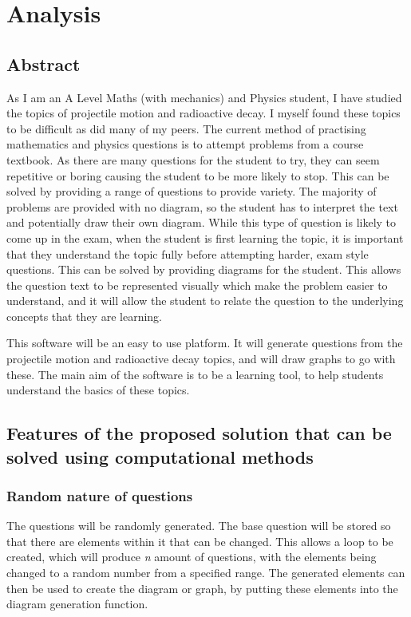 \chapter{Analysis}
\section{Abstract}
As I am an A Level Maths (with mechanics) and Physics student, I have studied the topics of projectile motion and radioactive decay. I myself found these topics to be difficult as did many of my peers. The current method of practising mathematics and physics questions is to attempt problems from a course textbook. As there are many questions for the student to try, they can seem repetitive or boring causing the student to be more likely to stop. This can be solved by providing a range of questions to provide variety. The majority of problems are provided with no diagram, so the student has to interpret the text and potentially draw their own diagram. While this type of question is likely to come up in the exam, when the student is first learning the topic, it is important that they understand the topic fully before attempting harder, exam style questions. This can be solved by providing diagrams for the student. This allows the question text to be represented visually which make the problem easier to understand, and it will allow the student to relate the question to the underlying concepts that they are learning.

This software will be an easy to use platform. It will generate questions from the projectile motion and radioactive decay topics, and will draw graphs to go with these. The main aim of the software is to be a learning tool, to help students understand the basics of these topics.
\section{Features of the proposed solution that can be solved using computational methods}
\subsection{Random nature of questions}
The questions will be randomly generated. The base question will be stored so that there are elements within it that can be changed. This allows a loop to be created, which will produce \textit{n} amount of questions, with the elements being changed to a random number from a specified range. The generated elements can then be used to create the diagram or graph, by putting these elements into the diagram generation function.
